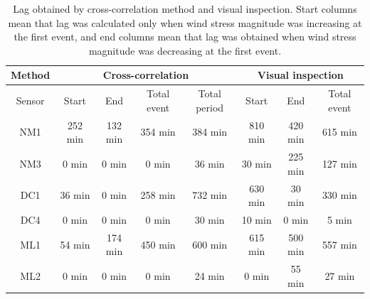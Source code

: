\documentclass[tesis.tex]{subfiles}
\begin{document}
\begin{table}[]
    \centering
    \caption{Lag obtained by cross-correlation method and visual inspection. Start columns mean that lag was calculated only when wind stress magnitude was increasing at the first event, and end columns mean that lag was obtained when wind stress magnitude was decreasing at the first event.}
    \begin{tabular}{|c|cccc|ccc|}
    \hline
    Method &
      \multicolumn{4}{c|}{Cross-correlation} &
      \multicolumn{3}{c|}{Visual inspection} \\ \hline
    Sensor &
      \multicolumn{1}{c|}{Start} &
      \multicolumn{1}{c|}{End} &
      \multicolumn{1}{c|}{Total event} &
      Total period &
      \multicolumn{1}{c|}{Start} &
      \multicolumn{1}{c|}{End} &
      Total event \\ \hline
    NM1 &
      \multicolumn{1}{c|}{252 min} &
      \multicolumn{1}{c|}{132 min} &
      \multicolumn{1}{c|}{354 min} &
      384 min &
      \multicolumn{1}{c|}{810 min} &
      \multicolumn{1}{c|}{420 min} &
      615 min \\ \hline
    NM3 &
      \multicolumn{1}{c|}{0 min} &
      \multicolumn{1}{c|}{0 min} &
      \multicolumn{1}{c|}{0 min} &
      36 min &
      \multicolumn{1}{c|}{30 min} &
      \multicolumn{1}{c|}{225 min} &
      127 min \\ \hline
    DC1 &
      \multicolumn{1}{c|}{36 min} &
      \multicolumn{1}{c|}{0 min} &
      \multicolumn{1}{c|}{258 min} &
      732 min &
      \multicolumn{1}{c|}{630 min} &
      \multicolumn{1}{c|}{30 min} &
      330 min \\ \hline
    DC4 &
      \multicolumn{1}{c|}{0 min} &
      \multicolumn{1}{c|}{0 min} &
      \multicolumn{1}{c|}{0 min} &
      30 min &
      \multicolumn{1}{c|}{10 min} &
      \multicolumn{1}{c|}{0 min} &
      5 min \\ \hline
    ML1 &
      \multicolumn{1}{c|}{54 min} &
      \multicolumn{1}{c|}{174 min} &
      \multicolumn{1}{c|}{450 min} &
      600 min &
      \multicolumn{1}{c|}{615 min} &
      \multicolumn{1}{c|}{500 min} &
      557 min \\ \hline
    ML2 &
      \multicolumn{1}{c|}{0 min} &
      \multicolumn{1}{c|}{0 min} &
      \multicolumn{1}{c|}{0 min} &
      24 min &
      \multicolumn{1}{c|}{0 min} &
      \multicolumn{1}{c|}{55 min} &
      27 min \\ \hline
    \end{tabular}
    \label{tab:lag}
    \end{table}
\end{document}
